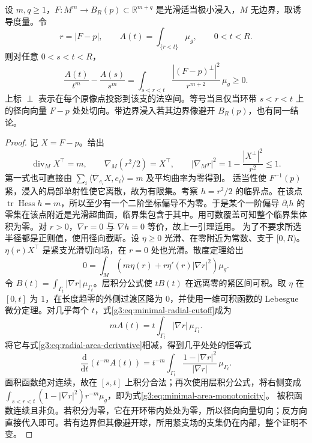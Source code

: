 \begin{theorem}\label{g3:thm:euclidean-minimal-monotonicity}
	设 \(m,q\ge1\)，\(F:M^m\to B_R(p)\subset\mathbb R^{m+q}\) 是光滑适当极小浸入，\(M\) 无边界，取诱导度量。令
	\[
		r=|F-p|,\qquad A(t)=\int_{\{r<t\}}\mu_g,\qquad 0<t<R.
	\]
	则对任意 \(0<s<t<R\)，
	\begin{equation}\label{g3:eq:minimal-area-monotonicity}
		\frac{A(t)}{t^m}-\frac{A(s)}{s^m}
		=\int_{s<r<t}\frac{|(F-p)^\perp|^2}{r^{m+2}}\,\mu_g\ge0.
	\end{equation}
	上标 \(\perp\) 表示在每个原像点投影到该支的法空间。等号当且仅当环带 \(s<r<t\) 上的径向向量 \(F-p\) 处处切向。带边界浸入若其边界像避开 \(B_R(p)\)，也有同一结论。
\end{theorem}
\begin{proof}
	记 \(X=F-p\)。给出
	\[
		\operatorname{div}_M X^\top=m,\qquad
		\nabla_M(r^2/2)=X^\top,\qquad
		|\nabla_Mr|^2=1-\frac{|X^\perp|^2}{r^2}\le1.
	\]
	第一式也可直接由 \(\sum_i\langle\overline\nabla_{e_i}X,e_i\rangle=m\) 及平均曲率为零得到。
	适当性使 \(F^{-1}(p)\) 紧，浸入的局部单射性使它离散，故为有限集。考察 \(h=r^2/2\) 的临界点。在该点 \(\operatorname{tr}\operatorname{Hess}h=m\)，所以至少有一个二阶坐标偏导不为零。于是某个一阶偏导 \(\partial_i h\) 的零集在该点附近是光滑超曲面，临界集包含于其中。用可数覆盖可知整个临界集体积为零。对 \(r>0\)，\(\nabla r=0\) 与 \(\nabla h=0\) 等价，故上一引理适用。
	为了不要求所选半径都是正则值，使用径向截断。设 \(\eta\ge0\) 光滑、在零附近为常数、支于 \([0,R)\)。\(\eta(r)X^\top\) 是紧支光滑切向场，在 \(r=0\) 处也光滑。散度定理给出
	\begin{equation}\label{g3:eq:minimal-radial-cutoff}
		0=\int_M\left(m\eta(r)+r\eta'(r)|\nabla r|^2\right)\mu_g.
	\end{equation}
	令 \(B(t)=\int_{\Gamma_t}|\nabla r|\,\mu_{\Gamma_t}\)。层积分公式使 \(tB(t)\) 在远离零的紧区间可积。取 \(\eta\) 在 \([0,t]\) 为 \(1\)，在长度趋零的外侧过渡区降为 \(0\)，并使用一维可积函数的 Lebesgue 微分定理。对几乎每个 \(t\)，式\eqref{g3:eq:minimal-radial-cutoff}成为
	\begin{equation}\label{g3:eq:minimal-radial-flux}
		mA(t)=t\int_{\Gamma_t}|\nabla r|\,\mu_{\Gamma_t}.
	\end{equation}
	将它与式\eqref{g3:eq:radial-area-derivative}相减，得到几乎处处的恒等式
	\[
		\frac{\mathrm d}{\mathrm dt}\left(t^{-m}A(t)\right)
		=t^{-m}\int_{\Gamma_t}
		\frac{1-|\nabla r|^2}{|\nabla r|}\,\mu_{\Gamma_t}.
	\]
	面积函数绝对连续，故在 \([s,t]\) 上积分合法；再次使用层积分公式，将右侧变成
	\(\int_{s<r<t}(1-|\nabla r|^2)r^{-m}\mu_g\)，即为式\eqref{g3:eq:minimal-area-monotonicity}。
	被积函数连续且非负。若积分为零，它在开环带内处处为零，所以径向向量切向；反方向直接代入即可。若有边界但其像避开球，所用紧支场的支集仍在内部，整个证明不变。
\end{proof}

